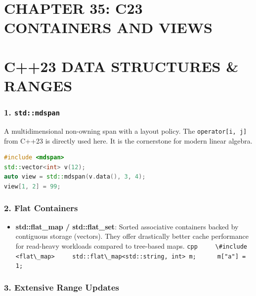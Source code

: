 \hypertarget{chapter-35-c23-containers-and-views}{%
\section{CHAPTER 35: C23 CONTAINERS AND
VIEWS}\label{chapter-35-c23-containers-and-views}}

\hypertarget{c23-data-structures-ranges}{%
\section{C++23 DATA STRUCTURES \&
RANGES}\label{c23-data-structures-ranges}}

\hypertarget{stdmdspan}{%
\subsubsection{\texorpdfstring{1.
\texttt{std::mdspan}}{1. std::mdspan}}\label{stdmdspan}}

A multidimensional non-owning span with a layout policy. The
\passthrough{\lstinline!operator[i, j]!} from C++23 is directly used
here. It is the cornerstone for modern linear algebra.

\begin{lstlisting}[language={C++}]
#include <mdspan>
std::vector<int> v(12);
auto view = std::mdspan(v.data(), 3, 4);
view[1, 2] = 99;
\end{lstlisting}

\hypertarget{flat-containers}{%
\subsubsection{2. Flat Containers}\label{flat-containers}}

\begin{itemize}
\tightlist
\item
  \textbf{std::flat\_map / std::flat\_set}: Sorted associative
  containers backed by contiguous storage (vectors). They offer
  drastically better cache performance for read-heavy workloads compared
  to tree-based maps.
  \passthrough{\lstinline!cpp     \#include <flat\_map>     std::flat\_map<std::string, int> m;      m["a"] = 1;!}
\end{itemize}

\hypertarget{extensive-range-updates}{%
\subsubsection{3. Extensive Range
Updates}\label{extensive-range-updates}}


